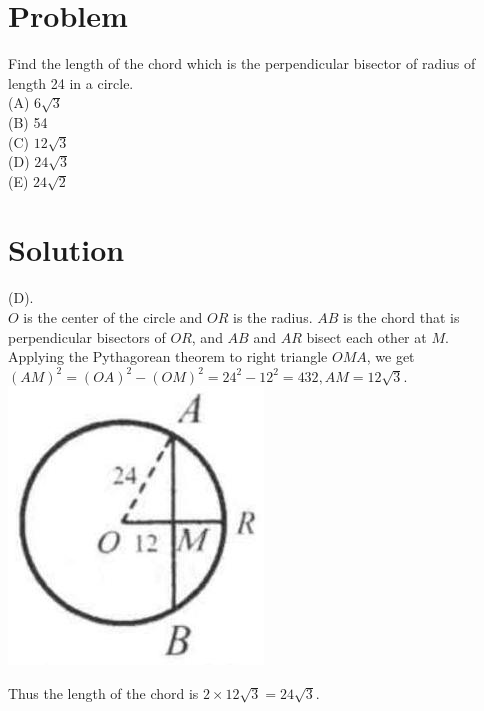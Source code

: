 \documentclass{article}
\begin{document}
\section*{Problem}
Find the length of the chord which is the perpendicular bisector of radius of length 24 in a circle.\\
(A) \(6 \sqrt{3}\)\\
(B) 54\\
(C) \(12 \sqrt{3}\)\\
(D) \(24 \sqrt{3}\)\\
(E) \(24 \sqrt{2}\)

\section*{Solution}
(D).\\
\(O\) is the center of the circle and \(O R\) is the radius. \(A B\) is the chord that is perpendicular bisectors of \(O R\), and \(A B\) and \(A R\) bisect each other at \(M\).\\
Applying the Pythagorean theorem to right triangle \(O M A\), we get \((A M)^{2}=(O A)^{2}-(O M)^{2}=24^{2}-12^{2}=432, A M=12 \sqrt{3}\).\\
\centering
\includegraphics[width=\textwidth]{images/159(1).jpg}

Thus the length of the chord is \(2 \times 12 \sqrt{3}=24 \sqrt{3}\).\\
\end{document}
